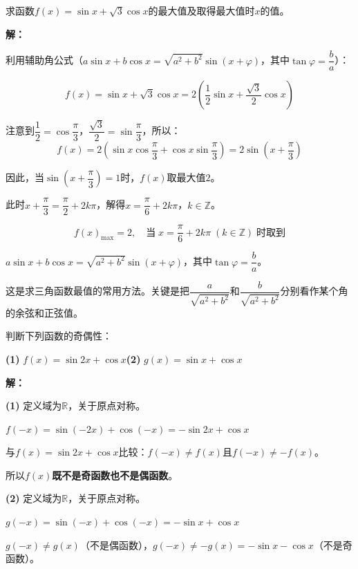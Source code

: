 \documentclass[12pt, a4paper]{ctexart}
\begin{document}
\begin{examplebox}[【例题10】三角函数的最值问题]
求函数$f(x)=\sin x+\sqrt{3}\cos x$的最大值及取得最大值时$x$的值。
\end{examplebox}

\textbf{解：}

利用辅助角公式（$a\sin x+b\cos x=\sqrt{a^2+b^2}\sin(x+\varphi)$，其中$\tan\varphi=\dfrac{b}{a}$）：

\[
  f(x)=\sin x+\sqrt{3}\cos x=2\left(\frac{1}{2}\sin x+\frac{\sqrt{3}}{2}\cos x\right)
\]

注意到$\dfrac{1}{2}=\cos\dfrac{\pi}{3}$，$\dfrac{\sqrt{3}}{2}=\sin\dfrac{\pi}{3}$，所以：
\[
  f(x)=2\left(\sin x\cos\frac{\pi}{3}+\cos x\sin\frac{\pi}{3}\right)=2\sin\!\left(x+\frac{\pi}{3}\right)
\]

因此，当$\sin\!\left(x+\dfrac{\pi}{3}\right)=1$时，$f(x)$取最大值$2$。

此时$x+\dfrac{\pi}{3}=\dfrac{\pi}{2}+2k\pi$，解得$x=\dfrac{\pi}{6}+2k\pi$，$k\in\mathbb{Z}$。

\[
  \boxed{f(x)_{\max}=2,\quad\text{当}\;x=\frac{\pi}{6}+2k\pi\;(k\in\mathbb{Z})\;\text{时取到}}
\]

\begin{tipbox}[辅助角公式]
$a\sin x+b\cos x=\sqrt{a^2+b^2}\sin(x+\varphi)$，其中$\tan\varphi=\dfrac{b}{a}$。

\medskip
这是求三角函数最值的常用方法。关键是把$\dfrac{a}{\sqrt{a^2+b^2}}$和$\dfrac{b}{\sqrt{a^2+b^2}}$分别看作某个角的余弦和正弦值。
\end{tipbox}

\begin{examplebox}[【例题11】三角函数的奇偶性判断]
判断下列函数的奇偶性：

\textbf{(1)} $f(x)=\sin 2x+\cos x$\qquad\textbf{(2)} $g(x)=\sin x+\cos x$
\end{examplebox}

\textbf{解：}

\textbf{(1)} 定义域为$\mathbb{R}$，关于原点对称。

$f(-x)=\sin(-2x)+\cos(-x)=-\sin 2x+\cos x$

与$f(x)=\sin 2x+\cos x$比较：$f(-x)\neq f(x)$且$f(-x)\neq-f(x)$。

所以$f(x)$\textbf{既不是奇函数也不是偶函数}。

\textbf{(2)} 定义域为$\mathbb{R}$，关于原点对称。

$g(-x)=\sin(-x)+\cos(-x)=-\sin x+\cos x$

$g(-x)\neq g(x)$（不是偶函数），$g(-x)\neq-g(x)=-\sin x-\cos x$（不是奇函数）。
\end{document}
